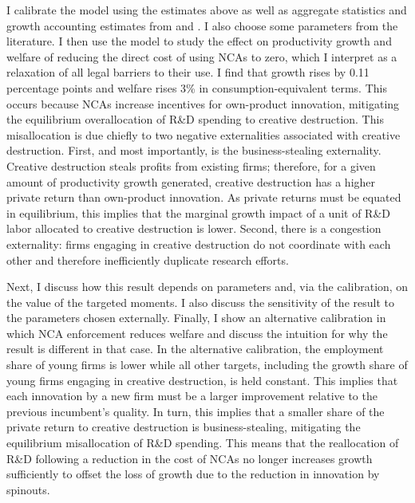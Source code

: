 \documentclass[11pt,english]{article}
\theoremstyle{definition}
\begin{document}
I calibrate the model using the estimates above as well as aggregate statistics and growth accounting estimates from \cite{garcia-macia_how_2019} and \cite{klenow_innovative_2020}. I also choose some parameters from the literature. I then use the model to study the effect on productivity growth and welfare of reducing the direct cost of using NCAs to zero, which I interpret as a relaxation of all legal barriers to their use. I find that growth rises by 0.11 percentage points and welfare rises 3\% in consumption-equivalent terms. This occurs because NCAs increase incentives for own-product innovation, mitigating the equilibrium overallocation of R\&D spending to creative destruction. This misallocation is due chiefly to two negative externalities associated with creative destruction. First, and most importantly, is the business-stealing externality. Creative destruction steals profits from existing firms; therefore, for a given amount of productivity growth generated, creative destruction has a higher private return than own-product innovation. As private returns must be equated in equilibrium, this implies that the marginal growth impact of a unit of R\&D labor allocated to creative destruction is lower. Second, there is a congestion externality: firms engaging in creative destruction do not coordinate with each other and therefore inefficiently duplicate research efforts. 

Next, I discuss how this result depends on parameters and, via the calibration, on the value of the targeted moments. I also discuss the sensitivity of the result to the parameters chosen externally. Finally, I show an alternative calibration in which NCA enforcement reduces welfare and discuss the intuition for why the result is different in that case. In the alternative calibration, the employment share of young firms is lower while all other targets, including the growth share of young firms engaging in creative destruction, is held constant. This implies that each innovation by a new firm must be a larger improvement relative to the previous incumbent's quality. In turn, this implies that a smaller share of the private return to creative destruction is business-stealing, mitigating the equilibrium misallocation of R\&D spending. This means that the reallocation of R\&D following a reduction in the cost of NCAs no longer increases growth sufficiently to offset the loss of growth due to the reduction in innovation by spinouts. 
\end{document}
